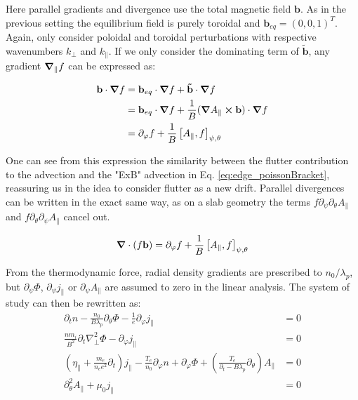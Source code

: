 Here parallel gradients and divergence use the total magnetic field $\mathbf{b}$. As in the previous setting the equilibrium field is purely toroidal and $\mathbf{b}_{eq} = (0,0,1)^T$. Again, only consider poloidal and toroidal perturbations with respective wavenumbers $k_\perp$ and $k_\parallel$. If we only consider the dominating term of $\mathbf{\tilde{b}}$, any gradient $\grad_\parallel f$ can be expressed as:

\begin{align}
	\mathbf{b}\cdot\grad f &= \mathbf{b}_{eq}\cdot\grad f + \mathbf{\tilde{b}} \cdot \grad f \nonumber\\
	&= \mathbf{b}_{eq}\cdot\grad f + \frac{1}{B}(\grad A_\parallel \cross \mathbf{b})\cdot\grad f \nonumber\\ 
	&= \partial_\varphi f + \frac{1}{B}\left[A_\parallel,f\right]_{\psi,\theta}
\end{align}

One can see from this expression the similarity between the flutter contribution to the advection and the "ExB" advection in Eq. \ref{eq:edge_poissonBracket}, reassuring us in the idea to consider flutter as a new drift. Parallel divergences can be written in the exact same way, as on a slab geometry the terms $f\partial_\psi\partial_\theta A_\parallel$ and $f\partial_\theta\partial_\psi A_\parallel$ cancel out.

\begin{equation}
	\grad \cdot (f\mathbf{b}) = \partial_\varphi f + \frac{1}{B}\left[A_\parallel,f\right]_{\psi,\theta}
\end{equation}

From the thermodynamic force, radial density gradients are prescribed to $n_0 / \lambda_p$, but $\partial_\psi\Phi$, $\partial_\psi j_\parallel$ or $\partial_\psi A_\parallel$ are assumed to zero in the linear analysis. The system of study can then be rewritten as:
\begin{align}
	\partial_t n - \frac{n_0}{B\lambda_p}\partial_\theta\Phi - \frac{1}{e}\partial_\varphi j_\parallel &= 0 \\
	\frac{nm_i}{B^2}\partial_t\nabla_\perp^2\Phi - \partial_\varphi j_\parallel &= 0\\
	\left(\eta_\parallel + \frac{m_e}{n_ee^2}\partial_t \right) j_\parallel - \frac{T_e}{n_0}\partial_\varphi n + \partial_\varphi \Phi  + \left(\frac{T_e}{\partial_t - B\lambda_p}\partial_\theta\right) A_\parallel &= 0 \\
	\partial_\theta^2 A_\parallel + \mu_0 j_\parallel &= 0
\end{align}

